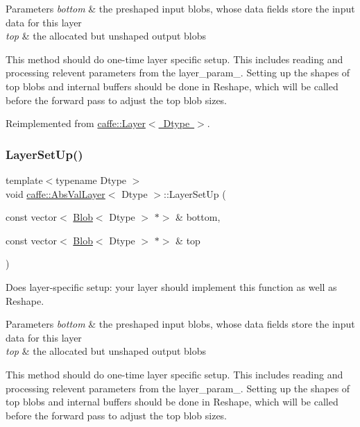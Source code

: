 \begin{DoxyParams}{Parameters}
{\em bottom} & the preshaped input blobs, whose data fields store the input data for this layer \\
\hline
{\em top} & the allocated but unshaped output blobs\\
\hline
\end{DoxyParams}
This method should do one-\/time layer specific setup. This includes reading and processing relevent parameters from the {\ttfamily layer\+\_\+param\+\_\+}. Setting up the shapes of top blobs and internal buffers should be done in {\ttfamily Reshape}, which will be called before the forward pass to adjust the top blob sizes. 

Reimplemented from \mbox{\hyperlink{classcaffe_1_1_layer_a481323a3e0972c682787f2137468c29f}{caffe\+::\+Layer$<$ Dtype $>$}}.

\mbox{\label{classcaffe_1_1_abs_val_layer_a4ef25e7d0cbe06404948d7e763bf0f84}} 
\subsubsection{\texorpdfstring{Layer\+Set\+Up()}{LayerSetUp()}\hspace{0.1cm}{\footnotesize\ttfamily [2/2]}}
{\footnotesize\ttfamily template$<$typename Dtype $>$ \\
void \mbox{\hyperlink{classcaffe_1_1_abs_val_layer}{caffe\+::\+Abs\+Val\+Layer}}$<$ Dtype $>$\+::Layer\+Set\+Up (\begin{DoxyParamCaption}\item[{const vector$<$ \mbox{\hyperlink{classcaffe_1_1_blob}{Blob}}$<$ Dtype $>$ $\ast$$>$ \&}]{bottom,  }\item[{const vector$<$ \mbox{\hyperlink{classcaffe_1_1_blob}{Blob}}$<$ Dtype $>$ $\ast$$>$ \&}]{top }\end{DoxyParamCaption})\hspace{0.3cm}{\ttfamily [virtual]}}



Does layer-\/specific setup\+: your layer should implement this function as well as Reshape. 


\begin{DoxyParams}{Parameters}
{\em bottom} & the preshaped input blobs, whose data fields store the input data for this layer \\
\hline
{\em top} & the allocated but unshaped output blobs\\
\hline
\end{DoxyParams}
This method should do one-\/time layer specific setup. This includes reading and processing relevent parameters from the {\ttfamily layer\+\_\+param\+\_\+}. Setting up the shapes of top blobs and internal buffers should be done in {\ttfamily Reshape}, which will be called before the forward pass to adjust the top blob sizes. 

